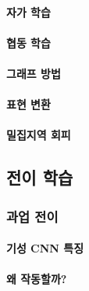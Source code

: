 \documentclass [12pt] {oblivoir}
\let\oldsubsubsection=\subsubsection
\renewcommand{\subsubsection}
{
  \filbreak
  \oldsubsubsection
}
\begin{document}
\vspace{3mm}

\paragraph*{자가 학습}\mbox{}

\vspace{3mm}

\paragraph*{협동 학습}\mbox{}

\vspace{3mm}

\paragraph*{그래프 방법}\mbox{}

\vspace{3mm}

\paragraph*{표현 변환}\mbox{}

\vspace{3mm}

\paragraph*{밀집지역 회피}\mbox{}

\vspace{3mm}

\subsection{전이 학습}

\subsubsection{과업 전이}

\paragraph*{기성 CNN 특징}\mbox{}

\vspace{3mm}

\paragraph*{왜 작동할까?}\mbox{}
\end{document}
